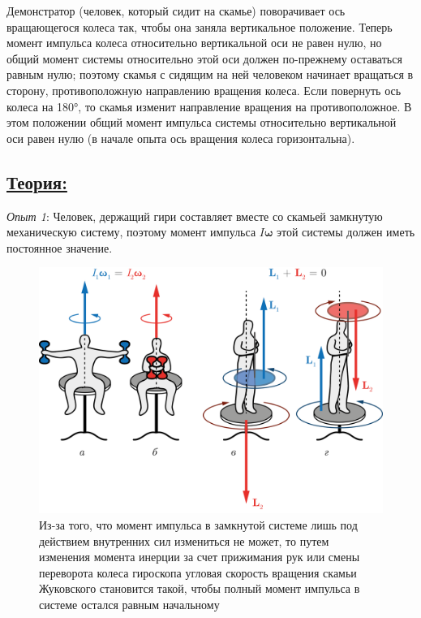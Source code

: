 \documentclass[14pt,a4paper,oneside]{extarticle}	%
\begin{document}
Демонстратор (человек, который сидит на скамье) поворачивает ось вращающегося колеса так, чтобы она заняла вертикальное положение. 
Теперь момент импульса колеса относительно вертикальной оси не равен нулю, но общий момент системы относительно этой оси должен по-прежнему оставаться равным нулю; поэтому скамья с сидящим на ней человеком начинает вращаться в сторону, противоположную направлению вращения колеса.
Если повернуть ось колеса на 180°, то скамья изменит направление вращения на противоположное.
В этом положении общий момент импульса системы относительно вертикальной оси равен нулю (в начале опыта ось вращения колеса  горизонтальна).
	
	\subsection*{\underline{Теория:}}
	
\textit{Опыт 1}:
 Человек, держащий гири составляет вместе со скамьей замкнутую механическую систему, поэтому момент импульса $ I\bm{\omega} $ этой системы должен иметь постоянное значение.
 	\begin{figure}[H] 	
 	\centering 	
 	\includegraphics[width=0.9\linewidth]{chair-2.png}
 	\caption{Из-за того, что момент импульса в замкнутой системе лишь под действием внутренних сил измениться не может, то путем изменения момента инерции за счет прижимания рук или смены переворота колеса гироскопа угловая скорость вращения скамьи Жуковского становится такой, чтобы полный момент импульса в системе остался равным начальному}
 	\label{chair-2}
 \end{figure}
\end{document}
